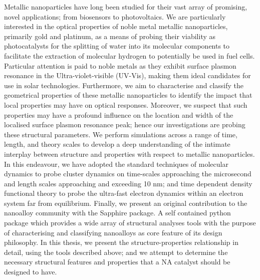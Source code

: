 
Metallic nanoparticles have long been studied for their vast array of promising, novel applications; from biosensors to photovoltaics. We are particularly interested in the
optical properties of noble metal metallic nanoparticles, primarily gold and platinum, as a means of probing their viability as photocatalysts for the splitting of water into its molecular components to facilitate the extraction of molecular hydrogen to potentially be used in fuel cells. Particular attention is paid to noble metals as they exhibit surface plasmon resonance in the Ultra-violet-visible (UV-Vis), making them ideal candidates for use in solar technologies. Furthermore, we aim to characterise and classify the geometrical properties of these metallic nanoparticles to identify the impact that local properties may have on optical responses. Moreover, we suspect that such properties may have a profound influence on the location and width of the localised surface plasmon resonance peak; hence our investigations are probing these structural parameters.
%
We perform simulations across a range of time, length, and theory scales to develop a deep understanding of the intimate interplay between structure and properties with respect to metallic nanoparticles. In this endeavour, we have adopted the standard techniques of molecular dynamics to probe cluster dynamics on time-scales approaching the microsecond and length scales approaching and exceeding 10 nm; and time dependent density functional theory to probe the ultra-fast electron dynamics within an electron system far from equilibrium.
%
Finally, we present an original contribution to the nanoalloy community with the Sapphire package. A self contained python package which provides a wide array of structural analyses tools with the purpose of characterising and classifying nanoalloys as core feature of its design philosophy.
%
In this thesis, we present the structure-properties relationship in detail, using the tools described above; and we attempt to determine the necessary structural features and properties that a NA catalyst should be designed to have.
%